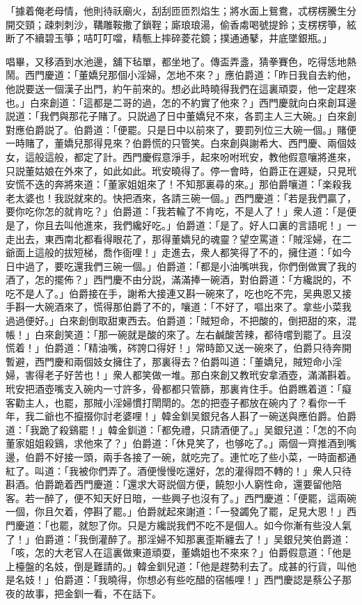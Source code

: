 「據着俺老母情，他則待祅廟火，刮刮匝匝烈焰生；將水面上鴛鴦，忒楞楞騰生分開交頸；疎刺刺沙，鞲雕鞍撒了鎖鞓；廝琅琅湯，偷香䖏喝號提鈴；支楞楞箏，絃断了不續碧玉箏；咭叮叮噹，精甎上摔碎菱花鏡；撲通通鼕，井底墜銀瓶。」

唱畢，又移酒到水池邊，舖下毡單，都坐地了。傳盃弄盞，猜拳賽色，吃得恁地熱鬧。西門慶道：「董嬌兒那個小淫婦，怎地不來？」應伯爵道：「昨日我自去約他，他説要送一個漢子出門，約午前來的。想必此時曉得我們在這裏頑耍，他一定趕來也。」白來創道：「這都是二哥的過，怎的不約實了他來？」西門慶就向白來創耳邊説道：「我們與那花子賭了。只説過了日中董嬌兒不來，各罰主人三大碗。」白來創對應伯爵説了。伯爵道：「便罷。只是日中以前來了，要罰列位三大碗一個。」賭便一時賭了，董嬌兒那得見來？伯爵慌的只管笑。白來創與謝希大、西門慶、兩個妓女，這般這般，都定了計。西門慶假意淨手，起來吩咐玳安，教他假意嚷將進來，只説董姑娘在外來了，如此如此。玳安曉得了。停一會時，伯爵正在遲疑，只見玳安慌不迭的奔將來道：「董家姐姐來了！不知那裏尋的來。」那伯爵嚷道：「楽殺我老太婆也！我説就來的。快把酒來，各請三碗一個。」西門慶道：「若是我們贏了，要你吃你怎的就肯吃？」伯爵道：「我若輸了不肯吃，不是人了！」衆人道：「是便是了，你且去叫他進來，我們纔好吃。」伯爵道：「是了。好人口裏的言語呢！」一走出去，東西南北都看得眼花了，那得董嬌兒的魂靈？望空罵道：「賊淫婦，在二爺面上這般的拔短梯，喬作衙哩！」走進去，衆人都笑得了不的，擁住道：「如今日中過了，要吃還我們三碗一個。」伯爵道：「都是小油嘴哄我，你們倒做實了我的酒了，怎的擺佈？」西門慶不由分説，滿滿捧一碗酒，對伯爵道：「方纔説的，不吃不是人了。」伯爵接在手，謝希大接連又斟一碗來了，吃也吃不完，吴典恩又接手斟一大碗酒來了，慌得那伯爵了不的，嚷道：「不好了，嘔出來了。拿些小菜我過過便好。」白來創倒取甜東西去。伯爵道：「賊短命，不把酸的，倒把甜的來，混帳！」白來創笑道：「那一碗就是酸的來了。左右鹹酸苦辣，都待嚐到罷了。且沒慌着！」伯爵道：「精油嘴，硶誇口得好！」常時節又送一碗來了，伯爵只待奔開暫避，西門慶和兩個妓女擁住了，那裏得去？伯爵叫道：「董嬌兒，賊短命小淫婦，害得老子好苦也！」衆人都笑做一堆。那白來創又教玳安拿酒壺，滿滿斟着。玳安把酒壺嘴支入碗内一寸許多，骨都都只管篩，那裏肯住手。伯爵瞧着道：「癡客勸主人，也罷，那賊小淫婦慣打閛閛的。怎的把壺子都放在碗内了？看你一千年，我二爺也不攛掇你討老婆哩！」韓金釧吴銀兒各人斟了一碗送與應伯爵。伯爵道：「我跪了殺鷄罷！」韓金釧道：「都免禮，只請酒便了。」吴銀兒道：「怎的不向董家姐姐殺鷄，求他來了？」伯爵道：「休見笑了，也够吃了。」兩個一齊推酒到嘴邊，伯爵不好接一頭，兩手各接了一碗，就吃完了。連忙吃了些小菜，一時面都通紅了。叫道：「我被你們弄了。酒便慢慢吃還好，怎的灌得悶不轉的！」衆人只待斟酒。伯爵跪着西門慶道：「還求大哥説個方便，饒恕小人窮性命，還要留他陪客。若一醉了，便不知天好日暗，一些興子也沒有了。」西門慶道：「便罷，這兩碗一個，你且欠着，停斟了罷。」伯爵就起來謝道：「一發蠲免了罷，足見大恩！」西門慶道：「也罷，就恕了你。只是方纔説我們不吃不是個人。如今你漸有些没人氣了！」伯爵道：「我倒灌醉了。那淫婦不知那裏歪斯纏去了！」吴銀兒笑伯爵道：「咳，怎的大老官人在這裏做東道頑耍，董嬌姐也不來來？」伯爵假意道：「他是上檯盤的名妓，倒是難請的。」韓金釧兒道：「他是趕勢利去了。成甚的行貨，叫他是名妓！」伯爵道：「我曉得，你想必有些吃醋的宿帳哩！」西門慶認是蔡公子那夜的故事，把金釧一看，不在話下。

